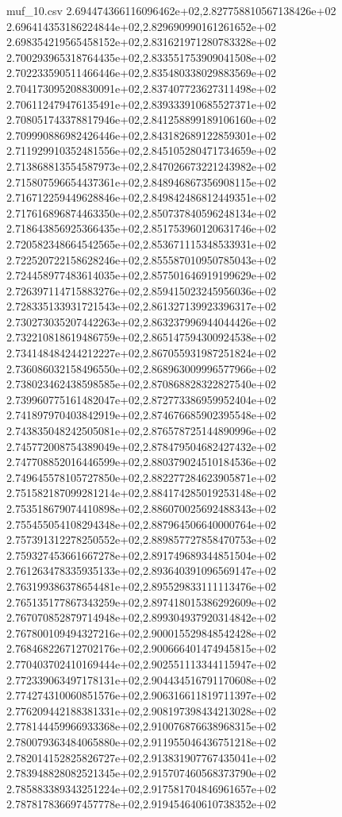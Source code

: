 \begin{filecontents*}{muf_10.csv}
2.694474366116096462e+02,2.827758810567138426e+02
2.696414353186224844e+02,2.829690990161261652e+02
2.698354219565458152e+02,2.831621971280783328e+02
2.700293965318764435e+02,2.833551753909041508e+02
2.702233590511466446e+02,2.835480338029883569e+02
2.704173095208830091e+02,2.837407723627311498e+02
2.706112479476135491e+02,2.839333910685527371e+02
2.708051743378817946e+02,2.841258899189106160e+02
2.709990886982426446e+02,2.843182689122859301e+02
2.711929910352481556e+02,2.845105280471734659e+02
2.713868813554587973e+02,2.847026673221243982e+02
2.715807596654437361e+02,2.848946867356908115e+02
2.716712259449628846e+02,2.849842486812449351e+02
2.717616896874463350e+02,2.850737840596248134e+02
2.718643856925366435e+02,2.851753960120631746e+02
2.720582348664542565e+02,2.853671115348533931e+02
2.722520722158628246e+02,2.855587010950785043e+02
2.724458977483614035e+02,2.857501646919199629e+02
2.726397114715883276e+02,2.859415023245956036e+02
2.728335133931721543e+02,2.861327139923396317e+02
2.730273035207442263e+02,2.863237996944044426e+02
2.732210818619486759e+02,2.865147594300924538e+02
2.734148484244212227e+02,2.867055931987251824e+02
2.736086032158496550e+02,2.868963009996577966e+02
2.738023462438598585e+02,2.870868828322827540e+02
2.739960775161482047e+02,2.872773386959952404e+02
2.741897970403842919e+02,2.874676685902395548e+02
2.743835048242505081e+02,2.876578725144890996e+02
2.745772008754389049e+02,2.878479504682427432e+02
2.747708852016446599e+02,2.880379024510184536e+02
2.749645578105727850e+02,2.882277284623905871e+02
2.751582187099281214e+02,2.884174285019253148e+02
2.753518679074410898e+02,2.886070025692488343e+02
2.755455054108294348e+02,2.887964506640000764e+02
2.757391312278250552e+02,2.889857727858470753e+02
2.759327453661667278e+02,2.891749689344851504e+02
2.761263478335935133e+02,2.893640391096569147e+02
2.763199386378654481e+02,2.895529833111113476e+02
2.765135177867343259e+02,2.897418015386292609e+02
2.767070852879714948e+02,2.899304937920314842e+02
2.767800109494327216e+02,2.900015529848542428e+02
2.768468226712702176e+02,2.900666401474945815e+02
2.770403702410169444e+02,2.902551113344115947e+02
2.772339063497178131e+02,2.904434516791170608e+02
2.774274310060851576e+02,2.906316611819711397e+02
2.776209442188381331e+02,2.908197398434213028e+02
2.778144459966933368e+02,2.910076876638968315e+02
2.780079363484065880e+02,2.911955046436751218e+02
2.782014152825826727e+02,2.913831907767435041e+02
2.783948828082521345e+02,2.915707460568373790e+02
2.785883389343251224e+02,2.917581704846961657e+02
2.787817836697457778e+02,2.919454640610738352e+02

\end{filecontents*}
